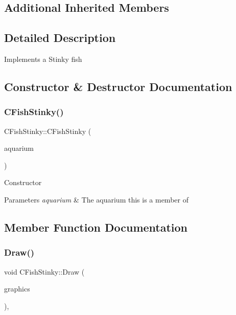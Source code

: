 \subsection*{Additional Inherited Members}


\subsection{Detailed Description}
Implements a Stinky fish 

\subsection{Constructor \& Destructor Documentation}
\mbox{\label{class_c_fish_stinky_a811254ce4150bbc4f6740a4f6fb75ff5}} 
\subsubsection{\texorpdfstring{CFishStinky()}{CFishStinky()}}
{\footnotesize\ttfamily C\+Fish\+Stinky\+::\+C\+Fish\+Stinky (\begin{DoxyParamCaption}\item[{\mbox{\hyperlink{class_c_aquarium}{C\+Aquarium}} $\ast$}]{aquarium }\end{DoxyParamCaption})}

Constructor 
\begin{DoxyParams}{Parameters}
{\em aquarium} & The aquarium this is a member of \\
\hline
\end{DoxyParams}


\subsection{Member Function Documentation}
\mbox{\label{class_c_fish_stinky_a48dd9938cc3750b6a2831a71dd8b6eb0}} 
\subsubsection{\texorpdfstring{Draw()}{Draw()}}
{\footnotesize\ttfamily void C\+Fish\+Stinky\+::\+Draw (\begin{DoxyParamCaption}\item[{Gdiplus\+::\+Graphics $\ast$}]{graphics }\end{DoxyParamCaption})\hspace{0.3cm}{\ttfamily [override]}, {\ttfamily [virtual]}}


